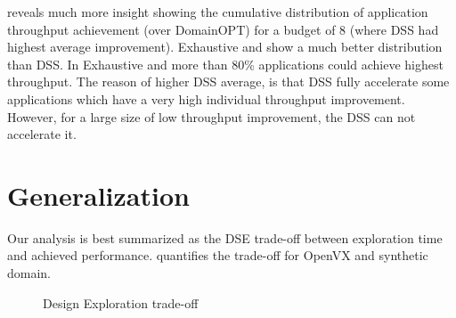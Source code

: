  reveals much more insight showing the cumulative distribution of application throughput achievement (over DomainOPT) for a budget of 8 (where DSS had highest average improvement). 
Exhaustive and \ga show a much better distribution than DSS. In Exhaustive and \ga more than 80\% applications could achieve highest throughput. 
The reason of higher DSS average, is that DSS fully accelerate some applications which have a very high individual throughput improvement.  However, for a large size of low throughput improvement, the DSS can not accelerate it. 



\section{Generalization}
\label{sec:generalization}

Our analysis is best summarized as the DSE trade-off between exploration time and achieved performance.  quantifies the trade-off for OpenVX and synthetic domain. 


\begin{figure}[H]
	\centering
		\hfill
	\caption{Design Exploration trade-off}
	\label{fig:paTime}
\end{figure}

